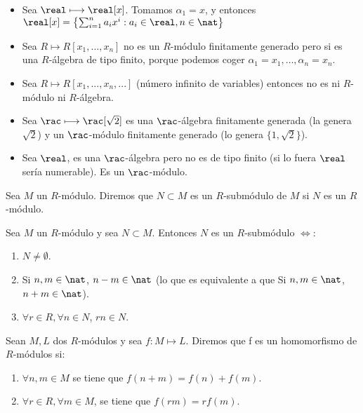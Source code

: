 \begin{example}
	\begin{itemize}
		\item Sea $\real \longmapsto \real[x]$. Tomamos $\alpha_1=x$, y entonces $\real[x]=\left\{ \sum_{i=1}^n a_ix^i: a_i \in \real, n\in \nat  \right\}$
		\item Sea $R \longmapsto R[x_1,\dots,x_n]$ no es un $R$-módulo finitamente generado pero si es una $R$-álgebra de tipo finito, porque podemos coger $\alpha_1=x_1,\dots,\alpha_n=x_n$.
		\item Sea $R \longmapsto R[x_1,...,x_n,...]$ (número infinito de variables) entonces no es ni $R$-módulo ni $R$-álgebra.
		\item Sea $\rac \longmapsto \rac[\sqrt{2}]$ es una $\rac$-álgebra finitamente generada (la genera $\sqrt{2}$) y un $\rac$-módulo finitamente generado (lo genera $\{ 1, \sqrt{2} \}$).
		\item Sea $\real$, es una $\rac$-álgebra pero no es de tipo finito (si lo fuera $\real$ sería numerable). Es un $\rac$-módulo.
	\end{itemize}
\end{example}

\begin{defn}[R-submódulo de M]
	Sea $M$ un $R$-módulo. Diremos que $N \subset M$ es un $R$-submódulo de $M$ si $N$ es un $R$-módulo.
\end{defn}
\begin{prop}
	Sea $M$ un $R$-módulo y sea $N \subset M$. Entonces $N$ es un $R$-submódulo $\Leftrightarrow$:
	\begin{enumerate}
		\item $N \neq \emptyset$.
		\item Si $n,m \in \nat$, $n-m \in \nat$ (lo que es equivalente a que Si $n,m \in \nat$, $n+m \in \nat$).
		\item $\forall r \in R, \forall n \in N$, $rn \in N$.
	\end{enumerate} 
\end{prop}

\begin{defn}
	Sean $M,L$ dos $R$-módulos y sea $f:M\longmapsto L$. Diremos que f es un homomorfismo de $R$-módulos si:
	\begin{enumerate}
		\item $\forall n,m \in M$ se tiene que $f(n+m)=f(n)+f(m)$.
		\item $\forall r \in R,\forall m \in M$, se tiene que $f(rm)=rf(m)$.
	\end{enumerate}
\end{defn}

